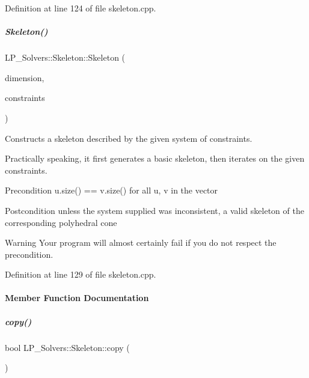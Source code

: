 Definition at line 124 of file skeleton.\+cpp.

\mbox{\label{group___c_l_s_solvers_ad61d70c2397e93141de3ad3c987b1828}} 
\subparagraph{\texorpdfstring{Skeleton()}{Skeleton()}\hspace{0.1cm}{\footnotesize\ttfamily [2/2]}}
{\footnotesize\ttfamily L\+P\+\_\+\+Solvers\+::\+Skeleton\+::\+Skeleton (\begin{DoxyParamCaption}\item[{N\+V\+A\+R\+\_\+\+T\+Y\+PE}]{dimension,  }\item[{const vector$<$ \hyperlink{group___c_l_s_solvers_class_l_p___solvers_1_1_constraint}{Constraint} $>$ \&}]{constraints }\end{DoxyParamCaption})}



Constructs a skeleton described by the given system of constraints. 

Practically speaking, it first generates a basic skeleton, then iterates on the given constraints. \begin{DoxyPrecond}{Precondition}
{\ttfamily u.\+size() == v.\+size()} for all {\ttfamily u}, {\ttfamily v} in the vector 
\end{DoxyPrecond}
\begin{DoxyPostcond}{Postcondition}
unless the system supplied was inconsistent, a valid skeleton of the corresponding polyhedral cone 
\end{DoxyPostcond}
\begin{DoxyWarning}{Warning}
Your program will almost certainly fail if you do not respect the precondition. 
\end{DoxyWarning}


Definition at line 129 of file skeleton.\+cpp.



\paragraph{Member Function Documentation}
\mbox{\label{group___c_l_s_solvers_a33b1747069c512ad69e30cb0c8786577}} 
\subparagraph{\texorpdfstring{copy()}{copy()}}
{\footnotesize\ttfamily bool L\+P\+\_\+\+Solvers\+::\+Skeleton\+::copy (\begin{DoxyParamCaption}\item[{const \hyperlink{group___c_l_s_solvers_class_l_p___solvers_1_1_l_p___solver}{L\+P\+\_\+\+Solver} $\ast$}]{ }\end{DoxyParamCaption})\hspace{0.3cm}{\ttfamily [virtual]}}



